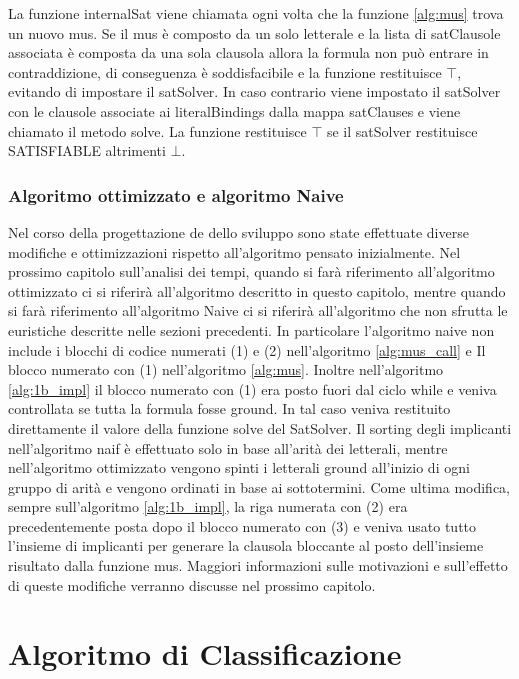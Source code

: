 \documentclass[./main.tex]{subfiles}
\begin{document}
La funzione internalSat viene chiamata ogni volta che la funzione \ref{alg:mus}
trova un nuovo mus. 
Se il mus è composto da un solo letterale e la lista di satClausole associata è composta 
da una sola clausola allora la formula non può entrare in contraddizione, di conseguenza 
è soddisfacibile e la funzione restituisce $\top$, evitando di impostare il satSolver.
In caso contrario viene impostato il satSolver con le clausole associate
ai literalBindings dalla mappa satClauses e viene chiamato il metodo solve.
La funzione restituisce $\top$ se il satSolver restituisce SATISFIABLE altrimenti $\bot$.

\subsubsection{Algoritmo ottimizzato e algoritmo Naive}

Nel corso della progettazione de dello sviluppo sono state effettuate diverse modifiche e ottimizzazioni 
rispetto all'algoritmo pensato inizialmente.
Nel prossimo capitolo sull'analisi dei tempi, quando si farà riferimento all'algoritmo ottimizzato ci si riferirà 
all'algoritmo descritto in questo capitolo, mentre quando si farà riferimento all'algoritmo Naive ci si riferirà all'algoritmo
che non sfrutta le euristiche descritte nelle sezioni precedenti.
In particolare l'algoritmo naive non include i blocchi di codice numerati (1) e (2) nell'algoritmo \ref{alg:mus_call} e
Il blocco numerato con (1) nell'algoritmo \ref{alg:mus}.
Inoltre nell'algoritmo \ref{alg:1b_impl} il blocco numerato con (1) era posto 
fuori dal ciclo while e veniva controllata se tutta la formula fosse ground.
In tal caso veniva restituito direttamente il valore della funzione solve del SatSolver.
Il sorting degli implicanti nell'algoritmo naif è effettuato solo in base all'arità dei letterali, mentre nell'algoritmo ottimizzato
vengono spinti i letterali ground all'inizio di ogni gruppo di arità e vengono ordinati in base ai sottotermini.
Come ultima modifica, sempre sull'algoritmo \ref{alg:1b_impl},
la riga numerata con (2) era precedentemente posta dopo il blocco numerato con (3)
e veniva usato tutto l'insieme di implicanti per generare la clausola bloccante
al posto dell'insieme risultato dalla funzione mus.
Maggiori informazioni sulle motivazioni e sull'effetto di queste modifiche verranno discusse nel prossimo capitolo.


\section{Algoritmo di Classificazione}  \label{sec:classifier}
\end{document}
